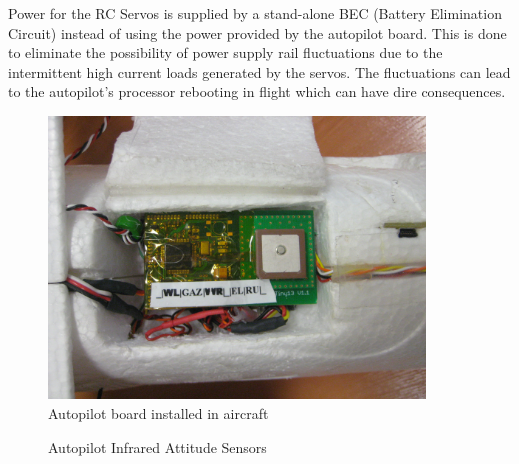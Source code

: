 \documentclass[a4paper,11pt]{report}
\begin{document}
Power for the RC Servos is supplied by a stand-alone BEC (Battery Elimination Circuit) instead of using the power provided by the autopilot board. This is done to eliminate the possibility of power supply rail fluctuations due to the intermittent high current loads generated by the servos. The fluctuations can lead to the autopilot's processor rebooting in flight which can have dire consequences.

\begin{figure}[ht]
 \centering
 \includegraphics[width=10cm]{tiny_inside.png}
 \caption{Autopilot board installed in aircraft}
 \label{fig:tiny}
\end{figure}

\begin{figure}[ht]
  \centering
  \caption{Autopilot Infrared Attitude Sensors}
  \label{fig:ir}
\end{figure}
\end{document}
